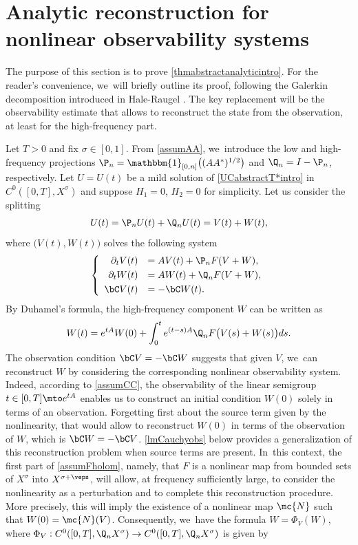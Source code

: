 \section{Analytic reconstruction for nonlinear observability systems}\label{sec:abstract-construction}

The purpose of this section is to prove \cref{thmabstractanalyticintro}. For the reader's convenience, we~will briefly outline its proof, following the Galerkin decomposition introduced in Hale-Raugel \cite{HR03}. The key replacement will be the observability estimate that allows to reconstruct the state from the observation, at least for the high-frequency part.

Let $T>0$ and fix $\sigma\in [0, 1]$. From \cref{assumAA}, we~introduce the low and high-frequency projections $\P_n=\mathbbm{1}_{[0, n]}\big((AA^*)^{1/2}\big)$ and $\Q_n=I-\P_n$, respectively. Let $U=U(t)$ be a mild solution of \eqref{UCabstractT*intro} in $C^0([0, T], X^\sigma)$ and suppose $H_1=0$, $H_2=0$ for simplicity. Let us consider the splitting
\begin{align*}
U(t)=\P_n U(t)+\Q_nU(t)=V(t)+W(t),
\end{align*}
where $\big(V(t), W(t)\big)$ solves the following system
\begin{align*}
\left\{\begin{array}{rl}
\partial_t V(t)&=AV(t)+\P_n F(V+W), \\[3pt]
\partial_t W(t)&=AW(t)+\Q_n F(V+W), \\[3pt]
\bC V(t)&=-\bC W(t).
\end{array}\right.
\end{align*}
By Duhamel's formula, the high-frequency component $W$ can be written as
\begin{align*}
W(t)=e^{tA}W(0)+\int_0^t e^{(t-s)A}\Q_n F\big(V(s)+W(s)\big)ds.
\end{align*}
The observation condition $\bC V=-\bC W$ suggests that given $V$, we~can reconstruct $W$ by considering the corresponding nonlinear observability system. Indeed, according to \cref{assumCC}, the observability of the linear semigroup $t\in [0, T]\mto e^{tA}$ enables us to construct an initial condition $W(0)$ solely in terms of an observation. Forgetting first about the source term given by the nonlinearity, that would allow to reconstruct $W(0)$ in terms of the observation of $W$, which is $\bC W=-\bC V$. \cref{lmCauchyobs} below provides a generalization of this reconstruction problem when source terms are present. In~this context, the first part of \cref{assumFholom}, namely, that $F$ is a nonlinear map from bounded sets of $X^\sigma$ into $X^{\sigma+\veps}$, will allow, at frequency sufficiently large, to consider the nonlinearity as a perturbation and to complete this reconstruction procedure. More precisely, this will imply the existence of a nonlinear map $\mc{N}$ such that $W(0)=\mc{N}(V)$. Consequently, we~have the formula $W=\Phi_V(W)$, where $\Phi_V: C^0([0, T], \Q_nX^\sigma)\to C^0([0, T], \Q_nX^\sigma)$ is given by
